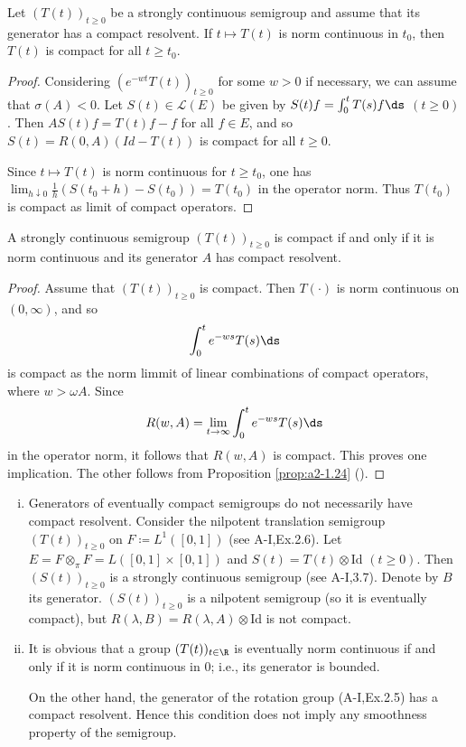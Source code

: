 \begin{proposition}\label{prop:a2-1.24}
Let $(T(t))_{t\geq 0}$ be a strongly continuous semigroup and assume that its generator has a compact resolvent.
If $t \mapsto T(t)$ is norm continuous in $t_0$, then $T(t)$ is compact for all $t \geq t_0$.
\end{proposition}
\begin{proof}
Considering $(e^{-wt}T(t))_{t\geq 0}$ for some $w > 0$ if necessary, we can assume that $\sigma(A) < 0$.
Let $S(t) \in \mathcal{L}(E)$ be given by 
$S(t)f = \int_0^t T(s)f \ds$ $(t \geq 0)$.
Then $AS(t)f = T(t)f - f$ for all $f \in E$, and so $S(t) = R(0,A)(Id-T(t))$ is compact for all $t \geq 0$.

Since $t \mapsto T(t)$ is norm continuous for $t \geq t_0$, one has 
$\lim_{h \downarrow 0} \frac{1}{h}(S(t_0+h)-S(t_0)) = T(t_0)$ in the operator norm.
Thus $T(t_0)$ is compact as limit of compact operators.
\end{proof}
\begin{theorem}\label{thm:a2-1.25}
A strongly continuous semigroup $(T(t))_{t\geq 0}$ is compact if and only if it is norm continuous and its generator $A$ has compact resolvent.
\end{theorem}
\begin{proof}
Assume that $(T(t))_{t\geq 0}$ is compact. Then $T(\cdot)$ is norm continuous on $(0,\infty)$, and so 
\[
    \int_{0}^{t} e^{-ws} T(s) \ds
\]
is compact as the norm limmit of linear combinations of compact operators, where $w > \omega{A}$.
Since 
\[
    R(w,A) = \lim_{t \to \infty} \int_{0}^{t} e^{-ws} T(s) \ds
\]
in the operator norm, it follows that $R(w,A)$ is compact.
This proves one implication.
The other follows from Proposition \ref{prop:a2-1.24} ().
\end{proof}
\begin{remark}\label{rem:a2-1.26}
\begin{enumerate}[(i), wide]
\item \label{rem:a2-1.26.1}
Generators of eventually compact semigroups do not necessarily have compact resolvent.
Consider the nilpotent translation semigroup $(T(t))_{t\geq 0}$ on $F \coloneqq L^{1}([0,1])$ (see A-I,Ex.2.6).
Let $E = F \otimes_{\pi} F = L([0,1] \times [0,1])$ and $S(t) = T(t) \otimes \text{Id}$ $(t \geq 0)$.
Then $(S(t))_{t\geq 0}$ is a strongly continuous semigroup (see A-I,3.7).
Denote by $B$ its generator.
$(S(t))_{t\geq 0}$ is a nilpotent semigroup (so it is eventually compact), but $R(\lambda,B) = R(\lambda,A) \otimes \text{Id}$ is not compact.

\item \label{rem:a2-1.26.2}
It is obvious that a group $(T(t))_{t \in \R}$ is eventually norm continuous if and only if it is norm continuous in $0$; i.e., its generator is bounded.

On the other hand, the generator of the rotation group (A-I,Ex.2.5) 
has a compact resolvent.
Hence this condition does not imply any smoothness property of the semigroup.
\end{enumerate}
\end{remark}

